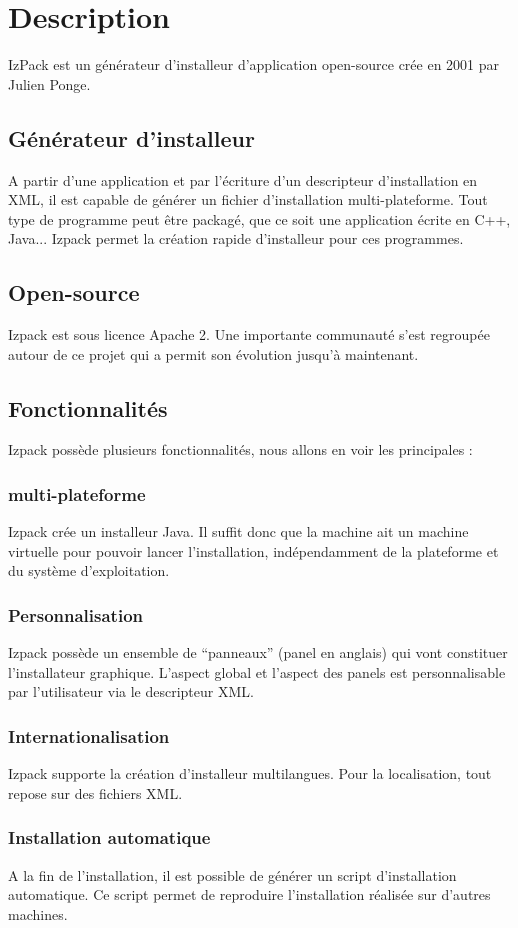 \section{Description}
IzPack est un générateur d'installeur d'application open-source crée en 2001 par Julien Ponge.
\subsection{Générateur d'installeur}
A partir d'une application et par l'écriture d'un descripteur d'installation en XML, il est capable de générer un fichier d'installation multi-plateforme. Tout type de programme peut être packagé, que ce soit une application écrite en C++, Java... Izpack permet la création rapide d'installeur pour ces programmes.
\subsection{Open-source}
Izpack est sous licence Apache 2. Une importante communauté s'est regroupée autour de ce projet qui a permit son évolution jusqu'à maintenant. 

\subsection{Fonctionnalités}
Izpack possède plusieurs fonctionnalités, nous allons en voir les principales :
\subsubsection{multi-plateforme}
Izpack crée un installeur Java. Il suffit donc que la machine ait un machine virtuelle pour pouvoir lancer l'installation, indépendamment de la plateforme et du système d'exploitation.
\subsubsection{Personnalisation}
Izpack possède un ensemble de ``panneaux'' (panel en anglais) qui vont constituer l'installateur graphique. L'aspect global et l'aspect des panels est personnalisable par l'utilisateur via le descripteur XML.
\subsubsection{Internationalisation}
Izpack supporte la création d'installeur multilangues. Pour la localisation, tout repose sur des fichiers XML.
\subsubsection{Installation automatique}
A la fin de l'installation, il est possible de générer un script d'installation automatique. Ce script permet de reproduire l'installation réalisée sur d'autres machines.
